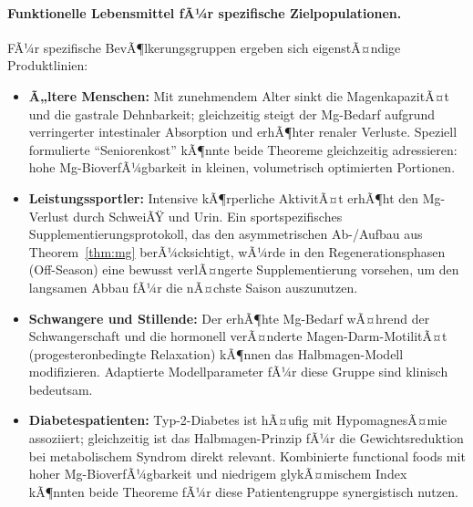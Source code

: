 ﻿\documentclass[12pt,a4paper]{article}
\theoremstyle{plain}
\theoremstyle{definition}
\theoremstyle{remark}
\begin{document}
\paragraph{Funktionelle Lebensmittel fÃ¼r spezifische Zielpopulationen.}
FÃ¼r spezifische BevÃ¶lkerungsgruppen ergeben sich eigenstÃ¤ndige
Produktlinien:
\begin{itemize}
  \item \textbf{Ã„ltere Menschen:} Mit zunehmendem Alter sinkt die
        MagenkapazitÃ¤t und die gastrale Dehnbarkeit; gleichzeitig steigt
        der Mg-Bedarf aufgrund verringerter intestinaler Absorption und
        erhÃ¶hter renaler Verluste. Speziell formulierte
        ``Seniorenkost'' kÃ¶nnte beide Theoreme gleichzeitig adressieren:
        hohe Mg-BioverfÃ¼gbarkeit in kleinen, volumetrisch optimierten
        Portionen.
  \item \textbf{Leistungssportler:} Intensive kÃ¶rperliche AktivitÃ¤t
        erhÃ¶ht den Mg-Verlust durch SchweiÃŸ und Urin. Ein
        sportspezifisches Supplementierungsprotokoll, das den
        asymmetrischen Ab-/Aufbau aus Theorem~\ref{thm:mg} berÃ¼cksichtigt,
        wÃ¼rde in den Regenerationsphasen (Off-Season) eine bewusst
        verlÃ¤ngerte Supplementierung vorsehen, um den langsamen Abbau fÃ¼r
        die nÃ¤chste Saison auszunutzen.
  \item \textbf{Schwangere und Stillende:} Der erhÃ¶hte Mg-Bedarf
        wÃ¤hrend der Schwangerschaft und die hormonell verÃ¤nderte
        Magen-Darm-MotilitÃ¤t (progesteronbedingte Relaxation) kÃ¶nnen das
        Halbmagen-Modell modifizieren. Adaptierte Modellparameter fÃ¼r
        diese Gruppe sind klinisch bedeutsam.
  \item \textbf{Diabetespatienten:} Typ-2-Diabetes ist hÃ¤ufig mit
        HypomagnesÃ¤mie assoziiert; gleichzeitig ist das Halbmagen-Prinzip
        fÃ¼r die Gewichtsreduktion bei metabolischem Syndrom direkt
        relevant. Kombinierte functional foods mit hoher Mg-BioverfÃ¼gbarkeit
        und niedrigem glykÃ¤mischem Index kÃ¶nnten beide Theoreme fÃ¼r diese
        Patientengruppe synergistisch nutzen.
\end{itemize}
\end{document}
